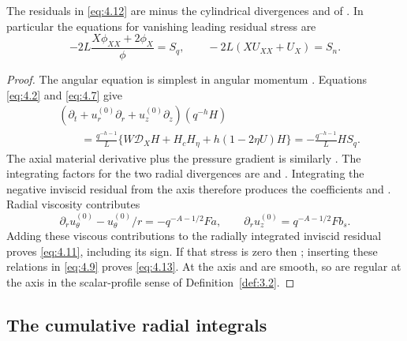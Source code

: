 \begin{proposition}\label{prop:4.2}
The residuals  in
\eqref{eq:4.12} are minus the cylindrical divergences
 and
 of
. In particular the equations for
vanishing leading residual stress are
\begin{equation}
 -2L\frac{X\phi_{XX}+2\phi_X}{\phi}=S_q,
 \qquad
 -2L(XU_{XX}+U_X)=S_n.
\tag{4.13}\label{eq:4.13}
\end{equation}
\end{proposition}

\begin{proof}
The angular equation is simplest in angular momentum
. Equations \eqref{eq:4.2} and
\eqref{eq:4.7} give
\begin{equation}
\begin{split}
 &(\partial_t+u_r^{(0)}\partial_r+u_z^{(0)}\partial_z)(q^{-h}H)\\
 &\qquad=\frac{q^{-h-1}}{L}
   \{W\mathcal D_XH+H_cH_\eta+h(1-2\eta U)H\}
   =-\frac{q^{-h-1}}{L}HS_q.
\end{split}
\tag{4.14}\label{eq:4.14}
\end{equation}
The axial material derivative plus the pressure gradient is similarly
. The integrating factors for the two
radial divergences are  and
. Integrating the negative inviscid residual from the
axis therefore produces the coefficients  and
. Radial viscosity contributes
\[
 \partial_ru_\theta^{(0)}-u_\theta^{(0)}/r=-q^{-A-1/2}Fa,
 \qquad
 \partial_ru_z^{(0)}=q^{-A-1/2}Fb_s.
\]
Adding these viscous contributions to the radially integrated inviscid
residual proves \eqref{eq:4.11}, including its sign. If that stress is zero
then ; inserting these relations
in \eqref{eq:4.9} proves \eqref{eq:4.13}. At the axis
 and
 are smooth, so
 are regular at the axis in the scalar-profile
sense of Definition~\ref{def:3.2}.
\end{proof}

%
\subsection{The cumulative radial integrals}\label{sec:4.2}

